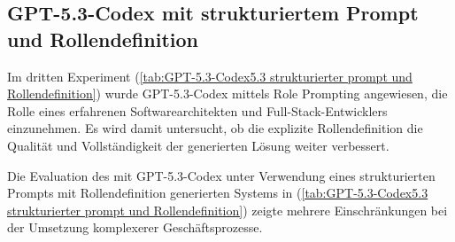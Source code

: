 \subsection{GPT-5.3-Codex mit strukturiertem Prompt und Rollendefinition}
Im dritten Experiment (\ref{tab:GPT-5.3-Codex5.3 strukturierter prompt und Rollendefinition}) wurde GPT-5.3-Codex mittels Role Prompting angewiesen, die Rolle eines erfahrenen Softwarearchitekten und Full-Stack-Entwicklers einzunehmen. Es wird damit untersucht, ob die explizite Rollendefinition die Qualität und Vollständigkeit der generierten Lösung weiter verbessert.

Die Evaluation des mit GPT-5.3-Codex  unter Verwendung eines strukturierten Prompts mit Rollendefinition generierten Systems in (\ref{tab:GPT-5.3-Codex5.3 strukturierter prompt und Rollendefinition}) zeigte mehrere Einschränkungen bei der Umsetzung komplexerer Geschäftsprozesse.


